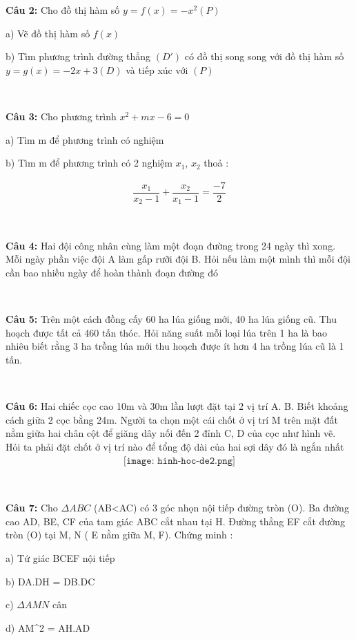 \documentclass[12pt]{article}
\begin{document}
\textbf{Câu 2:} Cho đồ thị hàm số $y=f(x)=-x^2(P)$ \par
a) Vẽ đồ thị hàm số $f(x)$ \par
b) Tìm phương trình đường thẳng $(D')$ có đồ thị song song với đồ thị hàm số $y=g(x)=-2x + 3 (D)$ và tiếp xúc với $(P)$

\ 

\textbf{Câu 3:} Cho phương trình $x^2+mx-6=0$ \par
a) Tìm m để phương trình có nghiệm \par
b) Tìm m để phương trình có 2 nghiệm $x_1$, $x_2$ thoả : \par

\begin{align}
\dfrac{x_1}{x_2-1} + \dfrac{x_2}{x_1-1} = \dfrac{-7}{2}
\end{align}

\ 

\textbf{Câu 4:} Hai đội công nhân cùng làm một đoạn đường trong 24 ngày thì xong. Mỗi ngày phần việc đội A làm gấp rưỡi đội B. Hỏi nếu làm một mình thì mỗi đội cần bao nhiều ngày để hoàn thành đoạn đường đó \par

\

\textbf{Câu 5:} Trên một cách đồng cấy 60 ha lúa giống mới, 40 ha lúa giống cũ. Thu hoạch được tất cả 460 tấn thóc. Hỏi năng suất mỗi loại lúa trên 1 ha là bao nhiêu biết rằng 3 ha trồng lúa mới thu hoạch được ít hơn 4 ha trồng lúa cũ là 1 tấn. \par

\

\textbf{Câu 6:} Hai chiếc cọc cao 10m và 30m lần lượt đặt tại 2 vị trí A. B. Biết khoảng cách giữa 2 cọc bằng 24m. Người ta chọn một cái chốt ở vị trí M trên mặt đất nằm giữa hai chân cột để giăng dây nối đến 2 đỉnh C, D của cọc như hình vẽ. Hỏi ta phải đặt chốt ở vị trí nào để tổng độ dài của hai sợi dây đó là ngắn nhất 
\begin{align}
    \texttt{[image: hinh-hoc-de2.png]}
\end{align}

\

\textbf{Câu 7:} Cho $\Delta ABC$ (AB<AC) có 3 góc nhọn nội tiếp đường tròn (O). Ba đường cao AD, BE, CF của tam giác ABC cắt nhau tại H. Đường thẳng EF cắt đường tròn (O) tại M, N ( E nằm giữa M, F). Chứng minh : \par
a) Tứ giác BCEF nội tiếp \par
b) DA.DH = DB.DC \par
c) $\Delta AMN$ cân \par
d) AM^2 = AH.AD
\end{document}
